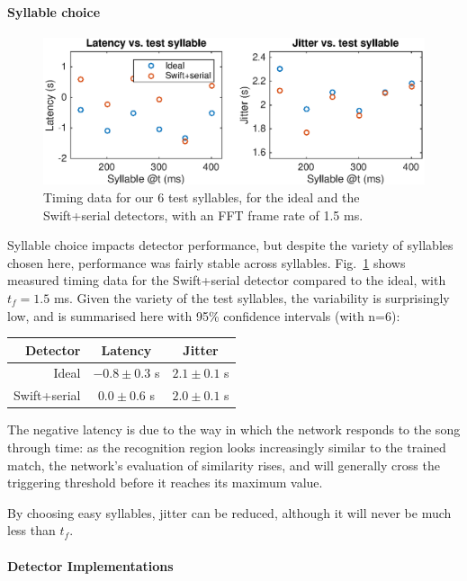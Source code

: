 \documentclass[10pt,letterpaper]{article}
\newcommand\fig[1]{Fig.~\ref{#1}}
\renewcommand{\subsubsection}[1]{\paragraph{#1}}
\begin{document}
\subsubsection{Syllable choice}

\begin{figure}
  \includegraphics[width=\textwidth]{TimingVsSyllable}
  \caption{Timing data for our 6 test syllables, for the ideal and the Swift+serial detectors, with an FFT frame rate of 1.5 ms.}
  \label{fig:TimingVsSyllable}
\end{figure}

Syllable choice impacts detector performance, but despite the variety of syllables chosen here, performance was fairly stable across syllables.  \fig{fig:TimingVsSyllable} shows measured timing data for the Swift+serial detector compared to the ideal, with $t_f=1.5$ ms.  Given the variety of the test syllables, the variability is surprisingly low, and is summarised here with 95\% confidence intervals (with n=6):
\vspace{8pt}\par\noindent
\begin{tabular}{r|cc}
  Detector & Latency & Jitter \\ 
  \hline   Ideal & $-0.8\pm 0.3$ s & $2.1\pm 0.1$ s \\
  Swift+serial & $0.0\pm 0.6$ s & $2.0\pm 0.1$ s
\end{tabular}
\vspace{8pt}\par\noindent
The negative latency is due to the way in which the network responds to the song through time: as the recognition region looks increasingly similar to the trained match, the network's evaluation of similarity rises, and will generally cross the triggering threshold before it reaches its maximum value.

By choosing easy syllables, jitter can be reduced, although it will never be much less than $t_f$.

\subsubsection{Detector Implementations}
\end{document}
